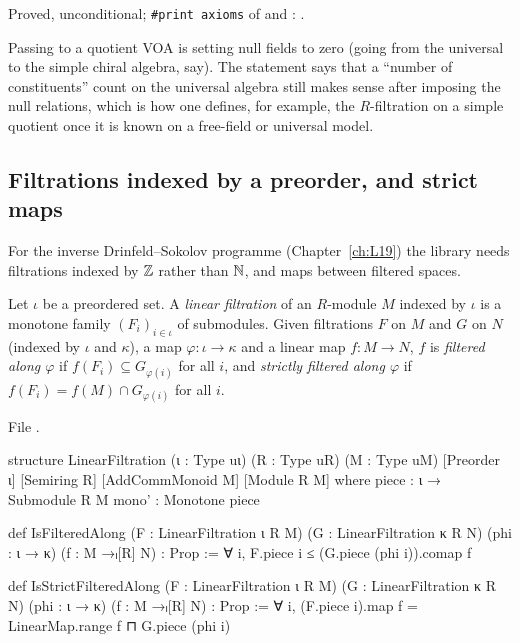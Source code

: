 \begin{status}
Proved, unconditional; \texttt{\#print axioms} of \allowbreak{}\allowbreak{} and
\allowbreak{}\allowbreak{}\allowbreak{}: \lean{[propext, Classical.}\allowbreak{}\allowbreak\lean{sound]}.
\end{status}

\begin{physics}
Passing to a quotient VOA is setting null fields to zero (going from the universal to the simple
chiral algebra, say). The statement says that a ``number of constituents'' count on the universal
algebra still makes sense after imposing the null relations, which is how one defines, for example,
the $R$-filtration on a simple quotient once it is known on a free-field or universal model.
\end{physics}

\subsection{Filtrations indexed by a preorder, and strict maps}

For the inverse Drinfeld--Sokolov programme (Chapter~\ref{ch:L19}) the library needs filtrations
indexed by ${\mathbb{Z}}$ rather than ${\mathbb{N}}$, and maps between filtered spaces.

\begin{definition}\label{l11:def:linfilt}
Let $\iota$ be a preordered set. A \emph{linear filtration} of an $R$-module $M$ indexed by $\iota$ is
a monotone family $(F_i)_{i\in\iota}$ of submodules. Given filtrations $F$ on $M$ and $G$ on $N$
(indexed by $\iota$ and $\kappa$), a map $\varphi:\iota\to\kappa$ and a linear map $f:M\to N$, $f$ is
\emph{filtered along $\varphi$} if $f(F_i)\subseteq G_{\varphi(i)}$ for all $i$, and \emph{strictly
filtered along $\varphi$} if $f(F_i) = f(M)\cap G_{\varphi(i)}$ for all $i$.
\end{definition}
\noindent File .
\begin{leancode}
structure LinearFiltration (ι : Type uι) (R : Type uR) (M : Type uM)
    [Preorder ι] [Semiring R] [AddCommMonoid M] [Module R M] where
  piece : ι → Submodule R M
  mono' : Monotone piece

def IsFilteredAlong (F : LinearFiltration ι R M) (G : LinearFiltration κ R N)
    (phi : ι → κ) (f : M →ₗ[R] N) : Prop :=
  ∀ i, F.piece i ≤ (G.piece (phi i)).comap f

def IsStrictFilteredAlong (F : LinearFiltration ι R M) (G : LinearFiltration κ R N)
    (phi : ι → κ) (f : M →ₗ[R] N) : Prop :=
  ∀ i, (F.piece i).map f = LinearMap.range f ⊓ G.piece (phi i)
\end{leancode}

